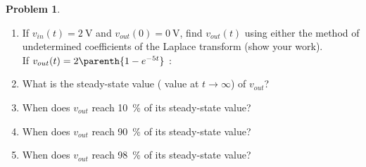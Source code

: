 \documentclass[10pt]{article}
\theoremstyle{definition}
\newtheorem{prob}{Problem}[section]
\newenvironment{subprob}%
{\renewcommand{\theenumi}{\alph{enumi}}\renewcommand{\labelenumi}{(\theenumi)}\begin{enumerate}}%
{\end{enumerate}}%
\begin{document}
\begin{prob}
    \begin{subprob}
    \item If \( v_{in}(t) = \SI{2}{\volt} \) and \( v_{out}(0) = \SI{0}{\volt} \), find \( v_{out}(t) \) using either the method of undetermined coefficients of the Laplace transform (show your work).
        \vspace*{6cm} \\

    If \( v_{out}(t) = 2 \parenth{ 1 -e^{-5 t} }\) :

    \item What is the steady-state value ( value at \( t \to \infty\)) of \( v_{out}\)?

        \vspace*{2cm}
    \item When does \( v_{out} \) reach \SI{10}{\percent} of its steady-state value?
        \vspace*{2cm}
    \item When does \( v_{out} \) reach \SI{90}{\percent} of its steady-state value?
        \vspace*{2cm}
    \item When does \( v_{out} \) reach \SI{98}{\percent} of its steady-state value?
    \end{subprob}
\end{prob}
\end{document}
